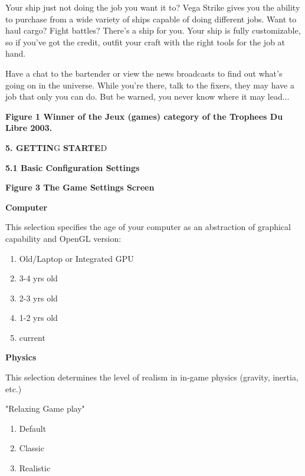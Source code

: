 \documentclass{article}
\begin{document}
Your ship just not doing the job you want it to? Vega Strike gives you the ability to purchase from a wide variety of ships capable of doing different jobs. Want to haul cargo? Fight battles? There's a ship for you. Your ship is fully customizable, so if you've got the credit, outfit your craft with the right tools for the job at hand. 

Have a chat to the bartender or view the news broadcasts to find out what's going on in the universe. While you're there, talk to the fixers, they may have a job that only you can do. But be warned, you never know where it may lead... 

\textbf{}

\textbf{Figure 1 Winner of the Jeux (games) category of the Trophees Du Libre 2003. }



\eject 



\textbf{5. GETTIN}G \textbf{STARTE}D\eject 

\textbf{5.1 Basic Configuration Settings }

\textbf{}

\textbf{Figure 3 The Game Settings Screen }

\textbf{Computer }

This selection specifies the age of your computer as an abstraction of graphical capability and OpenGL version: 

\begin{enumerate}
\item  Old/Laptop or Integrated GPU

\item  3-4 yrs old

\item  2-3 yrs old

\item  1-2 yrs old

\item current

\end{enumerate}
 

\textbf{Physics }

This selection determines the level of realism in in-game physics (gravity, inertia, etc.)

"Relaxing Game play"

\begin{enumerate}
\item  Default

\item  Classic

\item Realistic
\end{enumerate}
\end{document}
